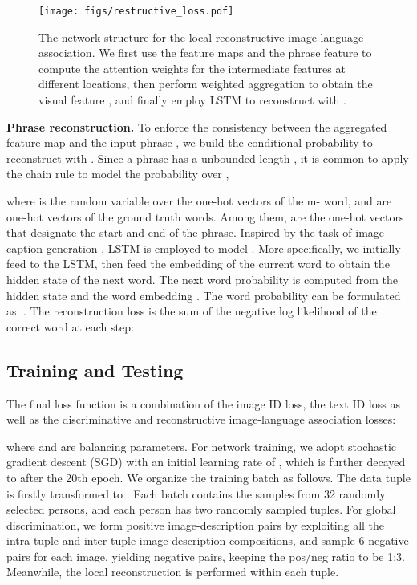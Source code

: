 \documentclass[runningheads]{llncs}
\begin{document}
 \begin{figure}[t]
 \begin{center}
\texttt{[image: figs/restructive\_loss.pdf]}
 \vspace{-1.5em}
 \caption{The network structure for the local reconstructive image-language association. We first use the feature maps  and the phrase feature  to compute the attention weights for the intermediate features at different locations, then perform weighted aggregation to obtain the visual feature , and finally employ LSTM to reconstruct  with .}  \vspace{-2em} \label{fig:local-reconstruction} 
 \end{center}
\end{figure}
\vspace{0.5em}

\noindent \textbf{Phrase reconstruction.}  To enforce the consistency between the aggregated feature map   and the input phrase , we build the conditional probability  to reconstruct  with . Since a phrase has a unbounded length , it is common to apply the chain rule to model the probability over ,

where  is the random variable over the one-hot vectors of the m- word, and  are one-hot vectors of the ground truth words. Among them,  are the one-hot vectors that designate the start and end of the phrase. Inspired by the task of image caption generation \cite{vinyals2015show, xu2015show}, LSTM is employed to model . More specifically, we initially feed  to the LSTM, then feed the embedding of the current word to obtain the hidden state of the next word. The next word probability is computed from the hidden state  and the word embedding . The word probability can be formulated as: . The reconstruction loss is the sum of the negative log likelihood of the correct word at each step:


\subsection{Training and Testing}

The final loss function is a combination of the image ID loss, the text ID loss as well as the discriminative and reconstructive image-language association losses:

where  and  are balancing parameters. For network training, we adopt stochastic gradient descent (SGD) with an initial learning rate of , which is further decayed to  after the 20th epoch.  We organize the training batch as follows.
The data tuple  is firstly transformed to .  Each batch contains the samples from 32 randomly selected persons, and each person has two randomly sampled tuples. For global discrimination, we form   positive image-description pairs by exploiting all the intra-tuple and inter-tuple image-description compositions, and sample 6 negative pairs for each image, yielding  negative pairs, keeping the pos/neg ratio to be 1:3. Meanwhile, the local reconstruction is performed within each tuple.
\end{document}
